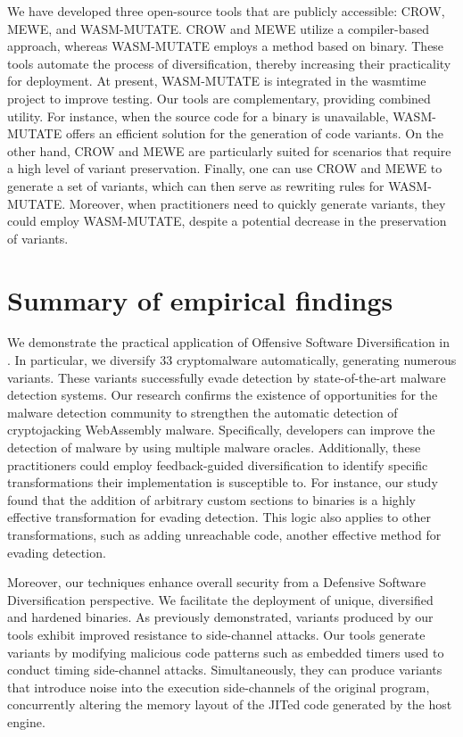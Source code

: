 We have developed three open-source tools that are publicly accessible: CROW, MEWE, and WASM-MUTATE. 
CROW and MEWE utilize a compiler-based approach, whereas WASM-MUTATE employs a method based on binary. 
These tools automate the process of diversification, thereby increasing their practicality for deployment. 
At present, WASM-MUTATE is integrated in the wasmtime project to improve testing. 
Our tools are complementary, providing combined utility. 
For instance, when the source code for a \Wasm binary is unavailable, WASM-MUTATE offers an efficient solution for the generation of code variants. 
On the other hand, CROW and MEWE are particularly suited for scenarios that require a high level of variant preservation.
Finally, one can use CROW and MEWE to generate a set of variants, which can then serve as rewriting rules for WASM-MUTATE. 
Moreover, when practitioners need to quickly generate variants, they could employ WASM-MUTATE, despite a potential decrease in the preservation of variants.


 

\section{Summary of empirical findings}

We demonstrate the practical application of Offensive Software Diversification in \Wasm.
In particular, we diversify 33 \Wasm cryptomalware automatically, generating numerous variants.
These variants successfully evade detection by state-of-the-art malware detection systems.
Our research confirms the existence of opportunities for the malware detection community to strengthen the automatic detection of cryptojacking WebAssembly malware.
Specifically, developers can improve the detection of \Wasm malware by using multiple malware oracles.
Additionally, these practitioners could employ feedback-guided diversification to identify specific transformations their implementation is susceptible to.
For instance, our study found that the addition of arbitrary custom sections to \Wasm binaries is a highly effective transformation for evading detection.
This logic also applies to other transformations, such as adding unreachable code, another effective method for evading detection.

Moreover, our techniques enhance overall security from a Defensive Software Diversification perspective.
We facilitate the deployment of unique, diversified and hardened \Wasm binaries.
As previously demonstrated, \Wasm variants produced by our tools exhibit improved resistance to side-channel attacks.
Our tools generate variants by modifying malicious code patterns such as embedded timers used to conduct timing side-channel attacks.
Simultaneously, they can produce variants that introduce noise into the execution side-channels of the original program, concurrently altering the memory layout of the JITed code generated by the host engine.


